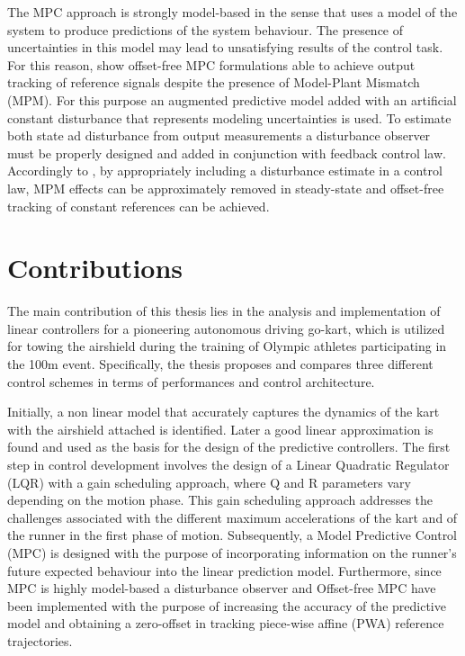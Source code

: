 \documentclass[a4paper,12pt,oneside]{book}
\begin{document}
\bigskip
The MPC approach is strongly model-based in the sense that uses a model of the system to produce predictions of the system behaviour. 
The presence of uncertainties in this model may lead to unsatisfying results of the control task. 
For this reason, \cite{Offset-free_compare, Linear_offset-free} show offset-free MPC formulations able to achieve output tracking of reference signals despite the presence of Model-Plant Mismatch (MPM).
For this purpose an augmented predictive model added with an artificial constant disturbance that represents modeling uncertainties is used. 
To estimate both state ad disturbance from output measurements a disturbance observer must be properly designed and added in conjunction with feedback control law.
Accordingly to \cite{Disturbance_observer}, by appropriately including a disturbance estimate in a control law, MPM effects can be approximately removed in steady-state and offset-free tracking of constant references can be achieved.


	
\section*{Contributions}
The main contribution of this thesis lies in the analysis and implementation of linear controllers for a pioneering autonomous driving go-kart, which is utilized for towing the airshield during the training of Olympic athletes participating in the 100m event.
Specifically, the thesis proposes and compares three different control schemes in terms of performances and control architecture.

\bigskip
Initially, a non linear model that accurately captures the dynamics of the kart with the airshield attached is identified. 
Later a good linear approximation is found and used as the basis for the design of the predictive controllers.
The first step in control development involves the design of a Linear Quadratic Regulator (LQR) with a gain scheduling approach, where Q and R parameters vary depending on the motion phase. 
This gain scheduling approach addresses the challenges associated with the different maximum accelerations of the kart and of the runner in the first phase of motion.
Subsequently, a Model Predictive Control (MPC) is designed with the purpose of incorporating information on the runner's future expected behaviour into the linear prediction model.
Furthermore, since MPC is highly model-based a disturbance observer and Offset-free MPC have been implemented with the purpose of increasing the accuracy of the predictive model and obtaining a zero-offset in tracking piece-wise affine (PWA) reference trajectories.
\end{document}
